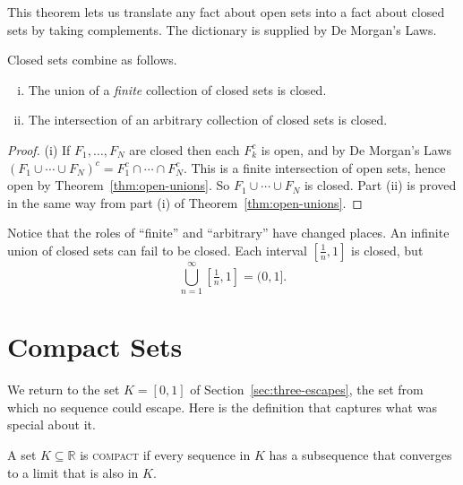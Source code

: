 This theorem lets us translate any fact about open sets into a fact about closed sets by taking complements.  The dictionary is supplied by De Morgan's Laws.

\begin{corollary}\label{cor:closed-unions}
Closed sets combine as follows.
\begin{enumerate}[(i)]
	\item The union of a \emph{finite} collection of closed sets is closed.
	\item The intersection of an arbitrary collection of closed sets is closed.
\end{enumerate}
\end{corollary}

\begin{proof}
(i)  If $F_1, \ldots, F_N$ are closed then each $F_k^c$ is open, and by De Morgan's Laws $(F_1 \cup \cdots \cup F_N)^c = F_1^c \cap \cdots \cap F_N^c$.  This is a finite intersection of open sets, hence open by Theorem~\ref{thm:open-unions}.  So $F_1 \cup \cdots \cup F_N$ is closed.  Part (ii) is proved in the same way from part (i) of Theorem~\ref{thm:open-unions}.
\end{proof}

Notice that the roles of ``finite'' and ``arbitrary'' have changed places.  An infinite union of closed sets can fail to be closed.  Each interval $\left[\frac1n, 1\right]$ is closed, but
\[ \bigcup_{n=1}^{\infty} \left[\tfrac1n, 1\right] = (0, 1]. \]

\section{Compact Sets}

We return to the set $K = [0,1]$ of Section~\ref{sec:three-escapes}, the set from which no sequence could escape.  Here is the definition that captures what was special about it.

\begin{definition}\label{def:compact}
A set $K \subseteq \mathbb{R}$ is \textsc{compact} if every sequence in $K$ has a subsequence that converges to a limit that is also in $K$.
\end{definition}

